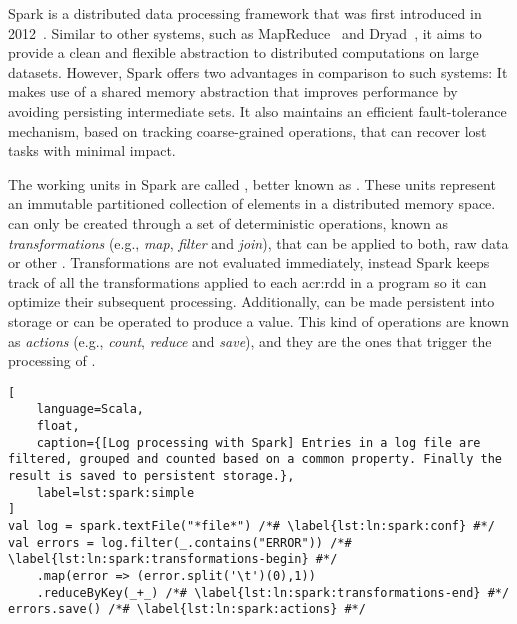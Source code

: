 \label{sec:spark}


Spark is a distributed data processing framework that was first introduced in 2012~\cite{Zaharia2012a}. Similar to other systems, such as MapReduce~\cite{Dean2008} and Dryad~\cite{Isard2007}, it aims to provide a clean and flexible abstraction to distributed computations on large datasets. However, Spark offers two advantages in comparison to such systems: It makes use of a shared memory abstraction that improves performance by avoiding persisting intermediate sets. It also maintains an efficient fault-tolerance mechanism, based on tracking coarse-grained operations, that can recover lost tasks with minimal impact.

The working units in Spark are called \textit{}, better known as . These units represent an immutable partitioned collection of elements in a distributed memory space.  can only be created through a set of deterministic operations, known as \textit{transformations} (e.g., \textit{map}, \textit{filter} and \textit{join}), that can be applied to both, raw data or other . Transformations are not evaluated immediately, instead Spark keeps track of all the transformations applied to each \acrshort{acr:rdd} in a program so it can optimize their subsequent processing. Additionally,  can be made persistent into storage or can be operated to produce a value. This kind of operations are known as \textit{actions} (e.g., \textit{count}, \textit{reduce} and \textit{save}), and they are the ones that trigger the processing of .

\begin{lstlisting}[
	language=Scala,
	float,
	caption={[Log processing with Spark] Entries in a log file are filtered, grouped and counted based on a common property. Finally the result is saved to persistent storage.},
	label=lst:spark:simple
]
val log = spark.textFile("*file*") /*# \label{lst:ln:spark:conf} #*/
val errors = log.filter(_.contains("ERROR")) /*# \label{lst:ln:spark:transformations-begin} #*/
	.map(error => (error.split('\t')(0),1))
	.reduceByKey(_+_) /*# \label{lst:ln:spark:transformations-end} #*/
errors.save() /*# \label{lst:ln:spark:actions} #*/
\end{lstlisting}

